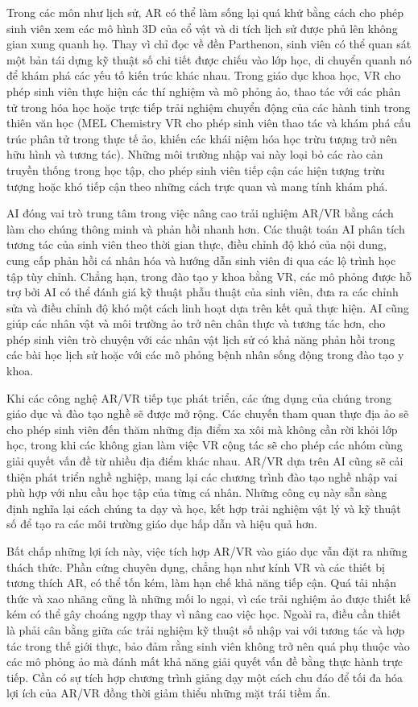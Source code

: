 Trong các môn như lịch sử, AR có thể làm sống lại quá khứ bằng cách cho phép sinh viên xem các mô hình 3D của cổ vật và di tích lịch sử được phủ lên không gian xung quanh họ. Thay vì chỉ đọc về đền Parthenon, sinh viên có thể quan sát một bản tái dựng kỹ thuật số chi tiết được chiếu vào lớp học, di chuyển quanh nó để khám phá các yếu tố kiến trúc khác nhau. Trong giáo dục khoa học, VR cho phép sinh viên thực hiện các thí nghiệm và mô phỏng ảo, thao tác với các phân tử trong hóa học hoặc trực tiếp trải nghiệm chuyển động của các hành tinh trong thiên văn học (MEL Chemistry VR cho phép sinh viên thao tác và khám phá cấu trúc phân tử trong thực tế ảo, khiến các khái niệm hóa học trừu tượng trở nên hữu hình và tương tác). Những môi trường nhập vai này loại bỏ các rào cản truyền thống trong học tập, cho phép sinh viên tiếp cận các hiện tượng trừu tượng hoặc khó tiếp cận theo những cách trực quan và mang tính khám phá.

AI đóng vai trò trung tâm trong việc nâng cao trải nghiệm AR/VR bằng cách làm cho chúng thông minh và phản hồi nhanh hơn. Các thuật toán AI phân tích tương tác của sinh viên theo thời gian thực, điều chỉnh độ khó của nội dung, cung cấp phản hồi cá nhân hóa và hướng dẫn sinh viên đi qua các lộ trình học tập tùy chỉnh. Chẳng hạn, trong đào tạo y khoa bằng VR, các mô phỏng được hỗ trợ bởi AI có thể đánh giá kỹ thuật phẫu thuật của sinh viên, đưa ra các chỉnh sửa và điều chỉnh độ khó một cách linh hoạt dựa trên kết quả thực hiện. AI cũng giúp các nhân vật và môi trường ảo trở nên chân thực và tương tác hơn, cho phép sinh viên trò chuyện với các nhân vật lịch sử có khả năng phản hồi trong các bài học lịch sử hoặc với các mô phỏng bệnh nhân sống động trong đào tạo y khoa.

Khi các công nghệ AR/VR tiếp tục phát triển, các ứng dụng của chúng trong giáo dục và đào tạo nghề sẽ được mở rộng. Các chuyến tham quan thực địa ảo sẽ cho phép sinh viên đến thăm những địa điểm xa xôi mà không cần rời khỏi lớp học, trong khi các không gian làm việc VR cộng tác sẽ cho phép các nhóm cùng giải quyết vấn đề từ nhiều địa điểm khác nhau. AR/VR dựa trên AI cũng sẽ cải thiện phát triển nghề nghiệp, mang lại các chương trình đào tạo nghề nhập vai phù hợp với nhu cầu học tập của từng cá nhân. Những công cụ này sẵn sàng định nghĩa lại cách chúng ta dạy và học, kết hợp trải nghiệm vật lý và kỹ thuật số để tạo ra các môi trường giáo dục hấp dẫn và hiệu quả hơn.

Bất chấp những lợi ích này, việc tích hợp AR/VR vào giáo dục vẫn đặt ra những thách thức. Phần cứng chuyên dụng, chẳng hạn như kính VR và các thiết bị tương thích AR, có thể tốn kém, làm hạn chế khả năng tiếp cận. Quá tải nhận thức và xao nhãng cũng là những mối lo ngại, vì các trải nghiệm ảo được thiết kế kém có thể gây choáng ngợp thay vì nâng cao việc học. Ngoài ra, điều cần thiết là phải cân bằng giữa các trải nghiệm kỹ thuật số nhập vai với tương tác và hợp tác trong thế giới thực, bảo đảm rằng sinh viên không trở nên quá phụ thuộc vào các mô phỏng ảo mà đánh mất khả năng giải quyết vấn đề bằng thực hành trực tiếp. Cần có sự tích hợp chương trình giảng dạy một cách chu đáo để tối đa hóa lợi ích của AR/VR đồng thời giảm thiểu những mặt trái tiềm ẩn.

